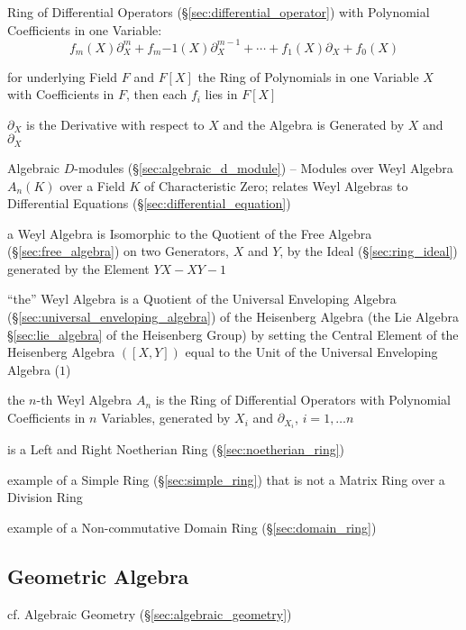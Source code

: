 Ring of Differential Operators (\S\ref{sec:differential_operator}) with
Polynomial Coefficients in one Variable:
\[
  f_m(X)\partial^m_X + f_m{-1}(X)\partial^{m-1}_X + \cdots +
  f_1(X)\partial_X + f_0(X)
\]

for underlying Field $F$ and $F[X]$ the Ring of Polynomials in one Variable $X$
with Coefficients in $F$, then each $f_i$ lies in $F[X]$

$\partial_X$ is the Derivative with respect to $X$ and the Algebra is Generated
by $X$ and $\partial_X$

\fist Algebraic $D$-modules (\S\ref{sec:algebraic_d_module}) -- Modules over
Weyl Algebra $A_n(K)$ over a Field $K$ of Characteristic Zero; relates Weyl
Algebras to Differential Equations (\S\ref{sec:differential_equation})

a Weyl Algebra is Isomorphic to the Quotient of the Free Algebra
(\S\ref{sec:free_algebra}) on two Generators, $X$ and $Y$, by the Ideal
(\S\ref{sec:ring_ideal}) generated by the Element $YX - XY - 1$

``the'' Weyl Algebra is a Quotient of the Universal Enveloping Algebra
(\S\ref{sec:universal_enveloping_algebra}) of the Heisenberg Algebra (the Lie
Algebra \S\ref{sec:lie_algebra} of the Heisenberg Group) by setting the Central
Element of the Heisenberg Algebra $([X,Y])$ equal to the Unit of the Universal
Enveloping Algebra ($1$)

the $n$-th Weyl Algebra $A_n$ is the Ring of Differential Operators with
Polynomial Coefficients in $n$ Variables, generated by $X_i$ and
$\partial_{X_i}$, $i = 1, \ldots n$

is a Left and Right Noetherian Ring (\S\ref{sec:noetherian_ring})

example of a Simple Ring (\S\ref{sec:simple_ring}) that is not a Matrix Ring
over a Division Ring

example of a Non-commutative Domain Ring (\S\ref{sec:domain_ring})



\subsection{Geometric Algebra}\label{sec:geometric_algebra}

cf. Algebraic Geometry (\S\ref{sec:algebraic_geometry})



